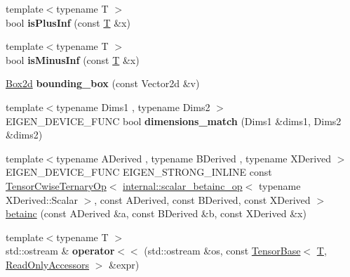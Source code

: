 \begin{DoxyCompactItemize}
\item 
\mbox{\label{namespace_eigen_ab8d65958858e32e62aeba1e4455a5737}} 
{\footnotesize template$<$typename T $>$ }\\bool {\bfseries is\+Plus\+Inf} (const \hyperlink{group___sparse_core___module}{T} \&x)
\item 
\mbox{\label{namespace_eigen_a73e4b5699212c361ff6818d5badb9e71}} 
{\footnotesize template$<$typename T $>$ }\\bool {\bfseries is\+Minus\+Inf} (const \hyperlink{group___sparse_core___module}{T} \&x)
\item 
\mbox{\label{namespace_eigen_a23f0b9ea6097dc2e17a5aec9b02e63a5}} 
\hyperlink{group___geometry___module_class_eigen_1_1_aligned_box}{Box2d} {\bfseries bounding\+\_\+box} (const Vector2d \&v)
\item 
\mbox{\label{namespace_eigen_a607e3b444d5d3d8bf23c06cd0ffba625}} 
{\footnotesize template$<$typename Dims1 , typename Dims2 $>$ }\\E\+I\+G\+E\+N\+\_\+\+D\+E\+V\+I\+C\+E\+\_\+\+F\+U\+NC bool {\bfseries dimensions\+\_\+match} (Dims1 \&dims1, Dims2 \&dims2)
\item 
{\footnotesize template$<$typename A\+Derived , typename B\+Derived , typename X\+Derived $>$ }\\E\+I\+G\+E\+N\+\_\+\+D\+E\+V\+I\+C\+E\+\_\+\+F\+U\+NC E\+I\+G\+E\+N\+\_\+\+S\+T\+R\+O\+N\+G\+\_\+\+I\+N\+L\+I\+NE const \hyperlink{class_eigen_1_1_tensor_cwise_ternary_op}{Tensor\+Cwise\+Ternary\+Op}$<$ \hyperlink{struct_eigen_1_1internal_1_1scalar__betainc__op}{internal\+::scalar\+\_\+betainc\+\_\+op}$<$ typename X\+Derived\+::\+Scalar $>$, const A\+Derived, const B\+Derived, const X\+Derived $>$ \hyperlink{namespace_eigen_a726eae91d4e91d8e25cbe55fffa6a92f}{betainc} (const A\+Derived \&a, const B\+Derived \&b, const X\+Derived \&x)
\item 
\mbox{\label{namespace_eigen_aef71933e43383bd0d52d4f23a8c5fdff}} 
{\footnotesize template$<$typename T $>$ }\\std\+::ostream \& {\bfseries operator$<$$<$} (std\+::ostream \&os, const \hyperlink{class_eigen_1_1_tensor_base}{Tensor\+Base}$<$ \hyperlink{group___sparse_core___module}{T}, \hyperlink{group__enums_gga9f93eac38eb83deb0e8dbd42ddf11d5da42865f87356ad7e585a1bfbfd1b81699}{Read\+Only\+Accessors} $>$ \&expr)

\end{DoxyCompactItemize}
